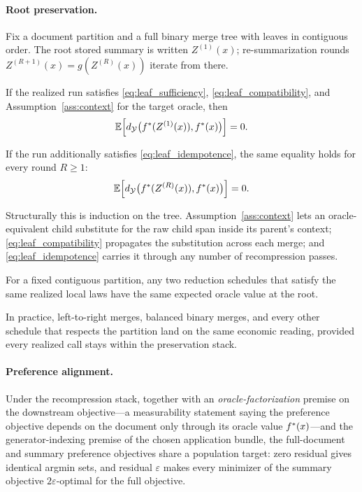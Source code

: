 \paragraph{Root preservation.}
Fix a document partition and a full binary merge tree with leaves in
contiguous order. The root stored summary is written $Z^{(1)}(x)$;
re-summarization rounds $Z^{(R+1)}(x) = g(Z^{(R)}(x))$ iterate from
there.

\begin{theorem}\label{thm:one-pass}
If the realized run satisfies \eqref{eq:leaf_sufficiency},
\eqref{eq:leaf_compatibility}, and Assumption~\ref{ass:context} for the
target oracle, then
\[
    \mathbb{E}\!\left[d_{\mathcal{Y}}\big(f^\ast(Z^{(1)}(x)),f^\ast(x)\big)\right] = 0.
\]
\end{theorem}

\begin{theorem}\label{thm:multi-round}
If the run additionally satisfies \eqref{eq:leaf_idempotence}, the
same equality holds for every round $R\ge 1$:
\[
    \mathbb{E}\!\left[d_{\mathcal{Y}}\big(f^\ast(Z^{(R)}(x)),f^\ast(x)\big)\right] = 0.
\]
\end{theorem}

Structurally this is induction on the tree.
Assumption~\ref{ass:context} lets an oracle-equivalent child substitute
for the raw child span inside its parent's context;
\eqref{eq:leaf_compatibility} propagates the substitution across each
merge; and \eqref{eq:leaf_idempotence} carries it through any number
of recompression passes.

\begin{corollary}\label{cor:schedule}
For a fixed contiguous partition, any two reduction schedules that
satisfy the same realized local laws have the same expected oracle
value at the root.
\end{corollary}

In practice, left-to-right merges, balanced binary merges, and every
other schedule that respects the partition land on the same economic
reading, provided every realized call stays within the preservation
stack.

\paragraph{Preference alignment.}
\begin{theorem}\label{thm:pref-equiv}
Under the recompression stack, together with an \emph{oracle-factorization}
premise on the downstream objective---a measurability statement saying
the preference objective depends on the document only through its
oracle value $f^\ast(x)$---and the generator-indexing premise of the
chosen application bundle, the full-document and summary preference
objectives share a population target: zero residual gives identical
argmin sets, and residual $\varepsilon$ makes every minimizer of the
summary objective $2\varepsilon$-optimal for the full objective.
\end{theorem}

